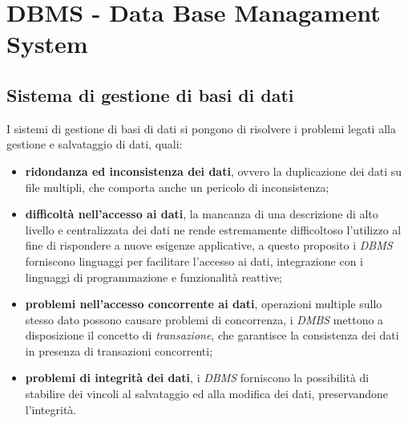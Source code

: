 \chapter{DBMS - Data Base Managament System}%
\label{cha:DBMS - Data Base Managament System}
\section{Sistema di gestione di basi di dati}%
\label{sec:Sistema di gestione di basi di dati}
I sistemi di gestione di basi di dati si pongono di risolvere i problemi legati
alla gestione e salvataggio di dati, quali:
\begin{itemize}
  \item \textbf{ridondanza ed inconsistenza dei dati}, ovvero la duplicazione
    dei dati su file multipli, che comporta anche un pericolo di inconsistenza;
  \item \textbf{difficoltà nell'accesso ai dati}, la mancanza di una descrizione
    di alto livello e centralizzata dei dati ne rende estremamente difficoltoso
    l'utilizzo al fine di rispondere a nuove esigenze applicative, a questo
    proposito i \emph{DBMS} forniscono linguaggi per facilitare l'accesso ai
    dati, integrazione con i linguaggi di programmazione e funzionalità
    reattive;
  \item \textbf{problemi nell'accesso concorrente ai dati}, operazioni multiple
    sullo stesso dato possono causare problemi di concorrenza, i \emph{DMBS}
    mettono a disposizione il concetto di \textit{transazione}, che garantisce
    la consistenza dei dati in presenza di transazioni concorrenti;
  \item \textbf{problemi di integrità dei dati}, i \emph{DBMS} forniscono la
    possibilità di stabilire dei vincoli al salvataggio ed alla modifica dei
    dati, preservandone l'integrità.
\end{itemize}
